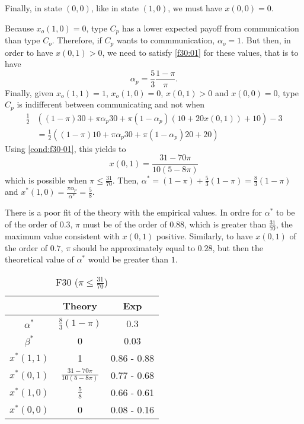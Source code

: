 \documentclass[12pt]{article}
\begin{document}
Finally, in state $(0,0)$, like in state $(1,0)$, we must have $x(0,0)=0$. 

Because $x_o(1,0)=0$, type $C_p$ has a lower expected payoff from communication than type $C_o$. Therefore, if $C_p$ wants to commmunication, $\alpha_o=1$. But then, in order to have $x(0,1)>0$, we need to satisfy \eqref{f30:01} for these values, that is to have 
\begin{equation}\label{cond:f30-01}	
\alpha_p=\frac{5}{3}\frac{1-\pi}{\pi}.
\end{equation}
%
Finally, given $x_o(1,1)=1$, $x_o(1,0)=0$, $x(0,1)>0$ and $x(0,0)=0$, type $C_p$ is indifferent between communicating and not when 
\[\begin{split}
	\frac{1}{2}&\left((1-\pi)30+\pi\alpha_p 30+\pi(1-\alpha_p)(10+20x(0,1))+10\right)-3\\ 
	&=
	\frac{1}{2}\left((1-\pi)10+\pi\alpha_p 30+\pi(1-\alpha_p)20+20\right)
\end{split}
\]
%
Using \eqref{cond:f30-01}, this yields to 
\[
x(0,1)=\frac{31-70\pi}{10(5-8\pi)}
\]
which is possible when $\pi\leq \frac{31}{70}$. Then, $\alpha^*=(1-\pi)+\frac{5}{3}(1-\pi)=\frac{8}{3}(1-\pi)$ and $x^*(1,0)=\frac{\pi\alpha_p}{\alpha^*}=\frac{5}{8}$.

There is a poor fit of the theory with the empirical values. In ordre for $\alpha^*$ to be of the order of $0.3$, $\pi$ must be of the order of $0.88$, which is greater than $\frac{31}{70}$, the maximum value consistent with $x(0,1)$ positive. Similarly,  to have $x(0,1)$ of the order of $0.7$, $\pi$ should be approximately equal to $ 0.28$, but then  the theoretical value of $\alpha^*$ would be greater than $1$. 
%
\begin{table}[h!]
	\begin{center}
		\renewcommand{\arraystretch}{1.5} 
\begin{tabular}{c c c}
	& Theory 	& Exp \\
	\hline 
	$\alpha^*$ 	& $\frac{8}{3}(1-\pi)$	& 0.3\\
	$\beta^*$ 	& 0 & 0.03\\ 
	\hline
	$x^*(1,1)$ 	& 1	& 0.86 - 0.88\\ 
	$x^*(0,1)$ & $\frac{31-70\pi}{10(5-8\pi)}$ & 0.77 - 0.68\\ 
	$x^*(1,0)$ & $\frac{5}{8}$ & 0.66 - 0.61\\
	$x^*(0,0)$ & 0 &  0.08 - 0.16\\
		\hline
\end{tabular}
\end{center}
\caption{F30 ($\pi\leq \frac{31}{70}$)}
\label{F30}
\end{table}
\end{document}
